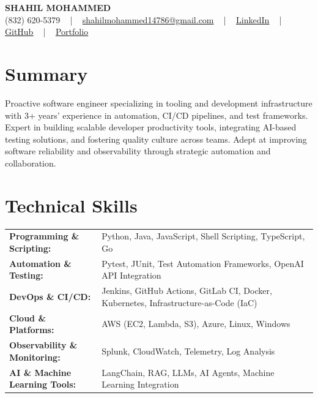 \documentclass[letterpaper,11pt]{article}
\begin{document}
\begin{center}
    {\fontsize{14pt}{12pt}\selectfont \textbf{\MakeUppercase{Shahil Mohammed}}}\\ \vspace{2pt}
    \fontsize{10pt}{12pt}\selectfont (832) 620-5379 ~ | ~ \href{mailto:shahilmohammed14786@gmail.com}{shahilmohammed14786@gmail.com} ~ | ~  
    \href{https://www.linkedin.com/in/shahil-mohammed-9652931a1/}{\color{blue}\underline{LinkedIn}}  ~ | ~ 
    \href{https://github.com/freakbeast14}{\color{blue}\underline{GitHub}} ~ | ~ 
    \href{https://shahil-mohammed.netlify.app/}{\color{blue}\underline{Portfolio}}
    \vspace{-8pt}
\end{center}

\section{Summary}
\fontsize{9pt}{10pt}\selectfont
Proactive software engineer specializing in tooling and development infrastructure with 3+ years’ experience in automation, CI/CD pipelines, and test frameworks. Expert in building scalable developer productivity tools, integrating AI-based testing solutions, and fostering quality culture across teams. Adept at improving software reliability and observability through strategic automation and collaboration.
 \vspace{-5pt}
 
\section{Technical Skills}
        \vspace{-14pt}
        \begin{table}[h]
            \fontsize{9pt}{10pt}\selectfont
            \begin{tabular}{p{0.3\linewidth} p{0.7\linewidth}}
                \textbf{Programming \& Scripting:} & Python, Java, JavaScript, Shell Scripting, TypeScript, Go \\
                \textbf{Automation \& Testing:} & Pytest, JUnit, Test Automation Frameworks, OpenAI API Integration \\
                \textbf{DevOps \& CI/CD:} & Jenkins, GitHub Actions, GitLab CI, Docker, Kubernetes, Infrastructure-as-Code (IaC) \\
                \textbf{Cloud \& Platforms:} & AWS (EC2, Lambda, S3), Azure, Linux, Windows \\
                \textbf{Observability \& Monitoring:} & Splunk, CloudWatch, Telemetry, Log Analysis \\
                \textbf{AI \& Machine Learning Tools:} & LangChain, RAG, LLMs, AI Agents, Machine Learning Integration \\
            \end{tabular}
        \end{table}
 \vspace{-15pt}
 
\end{document}
